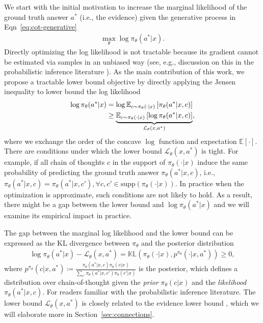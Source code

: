 \documentclass{article}
\theoremstyle{definition}
\begin{document}
We start with the initial motivation to increase the marginal likelihood of the ground truth answer $a^\ast$ (i.e., the evidence) given the generative process in Eqn~\eqref{eq:cot-generative}
\begin{align}
    \max_\theta \log \pi_\theta(a^\ast|x).\label{eq:likelihood-objective}
\end{align}
Directly optimizing the log likelihood 
is not tractable because its gradient cannot be estimated via samples in an unbiased way (see, e.g., discussion on this in the probabilistic inference literature \citep{blei2017variational}). As the main contribution of this work, we propose a tractable lower bound objective by directly applying the Jensen inequality to lower bound the log likelihood
\begin{align}
    \log \pi_\theta(a^\ast|x) &= \log \mathbb{E}_{c\sim \pi_\theta(\cdot|x)}\left[\pi_\theta(a^\ast|x,c)\right] \notag \\
    &\geq \underbrace{\mathbb{E}_{c\sim \pi_\theta(\cdot|x)}\left[\log 
\pi_\theta(a^\ast|x,c)\right]}_{\mathcal{L}_\theta(x,a^\ast)},\label{eq:simple-lower-bound}
\end{align}
where we exchange the order of the concave $\log$ function  and expectation $\mathbb{E}\left[\cdot\right]$. There are conditions under which the lower bound $\mathcal{L}_\theta(x,a^\ast)$ is tight. For example, if all chain of thoughts $c$ in the support of $\pi_\theta(\cdot|x)$ induce the same probability of predicting the ground truth answer $\pi_\theta(a^\ast|x,c)$, i.e., $\pi_\theta(a^\ast|x,c)=\pi_\theta(a^\ast|x,c'),\forall c,c' \in \text{supp}\left(\pi_\theta(\cdot|x)\right)$. In practice when the optimization is approximate, such conditions are not likely to hold. As a result, there might be a gap between the lower bound and $\log \pi_\theta(a^\ast|x)$ and we will examine its empirical impact in practice.

The gap between the marginal log likelihood and the lower bound can be expressed as the KL divergence between $\pi_\theta$ and the posterior distribution \citep{blei2017variational}
\begin{align*}
    \log \pi_\theta(a^\ast|x) - \mathcal{L}_\theta(x,a^\ast) = \mathbb{KL}\left(\pi_\theta(\cdot|x),p^{\pi_\theta}(\cdot|x,a^\ast)\right) \geq 0,
\end{align*}
where $p^{\pi_\theta}(c|x,a^\ast)\coloneqq \frac{\pi_\theta(a^\ast|x,c)\pi_\theta(c|x)}{\sum_{c'}\pi_\theta(a^\ast|x,c')\pi_\theta(c'|x)}$ is the posterior, which defines a distribution over chain-of-thought given the \emph{prior} $\pi_\theta(c|x)$ and the \emph{likelihood} $\pi_\theta(a^*|x,c)$. For readers familiar with the probabilistic inference literature. The lower bound $\mathcal{L}_\theta(x,a^*)$ is closely related to the evidence lower bound  \citep{kingma2013,blei2017variational}, which we will elaborate more in Section~\ref{sec:connections}.
\end{document}
